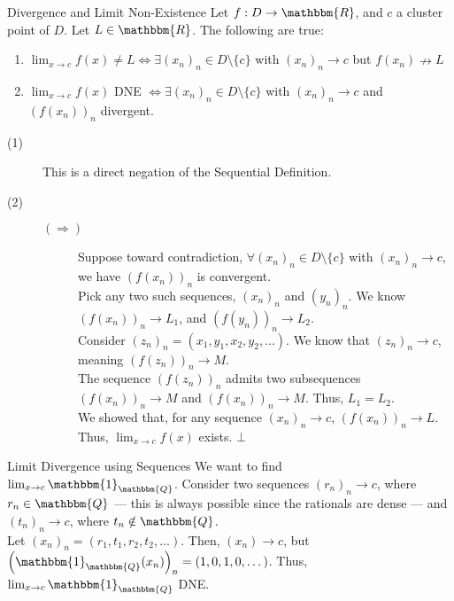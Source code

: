 \documentclass[10pt]{extarticle}
\newcommand{\Q}{\mathbbm{Q}}
\newcommand{\R}{\mathbbm{R}}
\begin{document}
  \begin{problem}{Divergence and Limit Non-Existence}
    Let $f: D\rightarrow \R$, and $c$ a cluster point of $D$. Let $L \in\R$. The following are true:
    \begin{enumerate}[(1)]
      \item $\lim_{x\rightarrow c}f(x) \neq L \Leftrightarrow \exists (x_n)_n \in D\setminus \{c\}$ with $(x_n)_n\rightarrow c$ but $f(x_n)\nrightarrow L$
      \item $\lim_{x\rightarrow c} f(x)$ DNE $\Leftrightarrow \exists (x_n)_n\in D\setminus\{c\}$ with $(x_n)_n \rightarrow c$ and $\left(f(x_n)\right)_n$ divergent.
    \end{enumerate}
    \tcblower
    \begin{description}
      \item[(1)] This is a direct negation of the Sequential Definition.
      \item[(2)]\hfill
        \begin{description}
          \item[$(\Rightarrow)$] Suppose toward contradiction, $\forall (x_n)_n\in D\setminus \{c\}$ with $(x_n)_n \rightarrow c$, we have $\left(f(x_n)\right)_n$ is convergent.\\

            Pick any two such sequences, $(x_n)_n$ and $(y_n)_n$. We know $\left(f(x_n)\right)_n \rightarrow L_1$, and $\left(f(y_n)\right)_n \rightarrow L_2$.\\

            Consider $(z_n)_n = (x_1,y_1,x_2,y_2,\dots)$. We know that $(z_n)_n \rightarrow c$, meaning $\left(f(z_n)\right)_n \rightarrow M$.\\

            The sequence $\left(f(z_n)\right)_n$ admits two subsequences $\left(f(x_n)\right)_n \rightarrow M$ and $\left(f(x_n)\right)_n \rightarrow M$. Thus, $L_1 = L_2$.\\

            We showed that, for any sequence $\left(x_n\right)_n \rightarrow c$, $\left(f(x_n)\right)_n \rightarrow L$. Thus, $\lim_{x\rightarrow c}f(x)$ exists. $\bot$\\
        \end{description}
    \end{description}
  \end{problem}
  \begin{problem}{Limit Divergence using Sequences}
    We want to find $\lim_{x\rightarrow c}\mathbbm{1}_{\Q}$. Consider two sequences $(r_n)_n \rightarrow c$, where $r_n \in \Q$ --- this is always possible since the rationals are dense --- and $(t_n)_n \rightarrow c$, where $t_n \notin \Q$.\\

    Let $(x_n)_n = (r_1,t_1,r_2,t_2,\dots)$. Then, $(x_n) \rightarrow c$, but $\left(\mathbbm{1}_{\Q}(x_n)\right)_n = (1,0,1,0,\dots)$. Thus, $\lim_{x\rightarrow c} \mathbbm{1}_{\Q}$ DNE.
  \end{problem}
\end{document}

